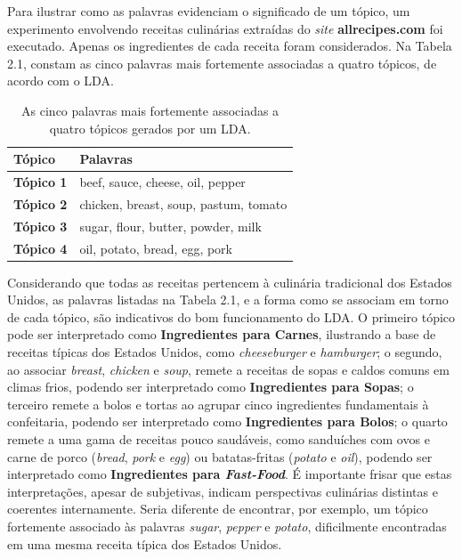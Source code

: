 Para ilustrar como as palavras evidenciam o significado de um tópico, um experimento envolvendo receitas culinárias extraídas do \emph{site} \textbf{allrecipes.com} foi executado. Apenas os ingredientes de cada receita foram considerados. Na Tabela 2.1, constam as cinco palavras mais fortemente associadas a quatro tópicos, de acordo com o LDA. %

\begin{table}[t]
\centering
\label{LDA:1}
\begin{tabular}{| l | p{7cm} | }
\hline
\textbf{Tópico} & \textbf{Palavras} \\ \hline
\textbf{Tópico 1} & beef, sauce, cheese, oil, pepper \\ \hline
\textbf{Tópico 2} & chicken, breast, soup, pastum, tomato \\ \hline
\textbf{Tópico 3} & sugar, flour, butter, powder, milk  \\ \hline
\textbf{Tópico 4} & oil, potato, bread, egg, pork \\ \hline
\end{tabular}
\caption{As cinco palavras mais fortemente associadas a quatro tópicos gerados por um LDA.}
\end{table}

Considerando que todas as receitas pertencem à culinária tradicional dos Estados Unidos, as palavras listadas na Tabela 2.1, e a forma como se associam em torno de cada tópico, são indicativos do bom funcionamento do LDA. O primeiro tópico pode ser interpretado como \textbf{Ingredientes para Carnes}, ilustrando a base de receitas típicas dos Estados Unidos, como \emph{cheeseburger} e \emph{hamburger}; o segundo, ao associar \emph{breast}, \emph{chicken} e \emph{soup}, remete a receitas de sopas e caldos comuns em climas frios, podendo ser interpretado como \textbf{Ingredientes para Sopas}; o terceiro remete a bolos e tortas ao agrupar cinco ingredientes fundamentais à confeitaria, podendo ser interpretado como \textbf{Ingredientes para Bolos}; o quarto remete a uma gama de receitas pouco saudáveis, como sanduíches com ovos e carne de porco (\emph{bread}, \emph{pork} e \emph{egg}) ou batatas-fritas (\emph{potato} e \emph{oil}), podendo ser interpretado como \textbf{Ingredientes para \emph{Fast-Food}}. É importante frisar que estas interpretações, apesar de subjetivas, indicam perspectivas culinárias distintas e coerentes internamente. Seria diferente de encontrar, por exemplo, um tópico fortemente associado às palavras \emph{sugar}, \emph{pepper} e \emph{potato}, dificilmente encontradas em uma mesma receita típica dos Estados Unidos.


